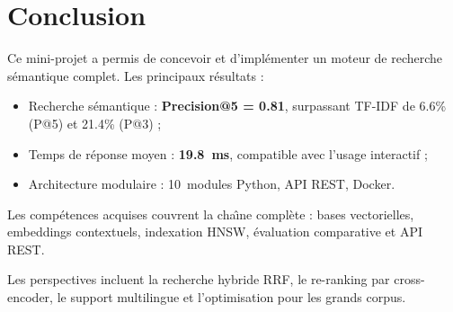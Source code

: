 \documentclass[12pt,a4paper]{article}
\begin{document}
\section{Conclusion}
\label{sec:conclusion}

Ce mini-projet a permis de concevoir et d'impl\'{e}menter un moteur de recherche s\'{e}mantique complet. Les principaux r\'{e}sultats :

\begin{itemize}[noitemsep]
    \item Recherche s\'{e}mantique : \textbf{Precision@5 = 0.81}, surpassant TF-IDF de 6.6\% (P@5) et 21.4\% (P@3) ;
    \item Temps de r\'{e}ponse moyen : \textbf{19.8~ms}, compatible avec l'usage interactif ;
    \item Architecture modulaire : 10~modules Python, API REST, Docker.
\end{itemize}

Les comp\'{e}tences acquises couvrent la cha\^{\i}ne compl\`{e}te : bases vectorielles, embeddings contextuels, indexation HNSW, \'{e}valuation comparative et API REST.

Les perspectives incluent la recherche hybride RRF, le re-ranking par cross-encoder, le support multilingue et l'optimisation pour les grands corpus.
\end{document}
